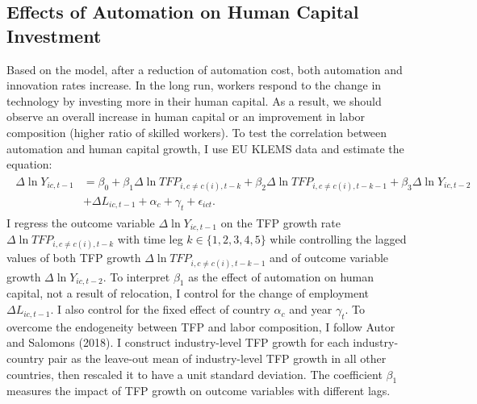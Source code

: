 \documentclass[12pt]{article}
\begin{document}
\begin{appendices}
\subsection{Effects of Automation on Human Capital Investment}
Based on the model, after a reduction of automation cost, both automation and innovation rates increase. In the long run, workers respond to the change in technology by investing more in their human capital. As a result, we should observe an overall increase in human capital or an improvement in labor composition (higher ratio of skilled workers). To test the correlation between automation and human capital growth, I use EU KLEMS data and estimate the equation:
\begin{align}
\begin{split}
 \Delta \ln Y_{i c, t-1} &=\beta_{0}+\beta_{1} \Delta \ln TFP_{i, c \neq c(i), t-k} +\beta_{2} \Delta \ln TFP_{i, c \neq c(i), t-k-1}+\beta_{3} \Delta \ln Y_{i c, t-2}\\
 &+\Delta L_{i c, t-1}+\alpha_{c}+\gamma_{t}+\epsilon_{ict}.
 \end{split}
\end{align}
I regress the outcome variable $\Delta \ln Y_{i c, t-1}$ on the TFP growth rate $\Delta \ln TFP_{i, c \neq c(i), t-k}$ with time leg $k \in \{1,2,3,4,5\}$ while controlling the lagged values of both TFP growth $\Delta \ln TFP_{i, c \neq c(i), t-k-1}$ and of outcome variable growth $\Delta \ln Y_{ic, t-2}$. To interpret $\beta_{1}$ as the effect of automation on human capital, not a result of relocation, I control for the change of employment $\Delta L_{i c, t-1}$. I also control for the fixed effect of country $\alpha_{c}$ and year $\gamma_{t}$. To overcome the endogeneity between TFP and labor composition, I follow Autor and Salomons (2018)\nocite{AutorSalomons2018}. I construct industry-level TFP growth for each industry-country pair as the leave-out mean of industry-level TFP growth in all other countries, then rescaled it to have a unit standard deviation. The coefficient $\beta_{1}$ measures the impact of TFP growth on outcome variables with different lags. 


\end{appendices}
\end{document}
